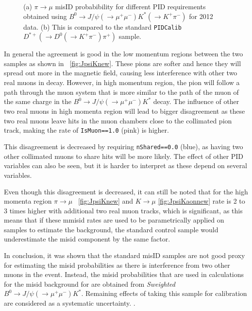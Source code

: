 \begin{figure}[h!]
		\caption{(a) $\pi \rightarrow \mu$ misID probabibility for different PID requirements obtained using $B^{0} \rightarrow J/\psi(\rightarrow \mu^{+} \mu^{-}) K^{*} (\rightarrow {K^{+} \pi^{-}} )$ for 2012 data. (b) This is compared to the standard \texttt{PIDCalib} $D^{*+}(\rightarrow D^{0}(\rightarrow K^{+} \pi^{-}) \pi^{+})$ sample. }
		\label{fig:JpsiKnew}
\end{figure}

In general the agreement is good in the low momentum regions between the two samples as shown in ~\autoref{fig:JpsiKnew}. These pions are softer and hence they will spread out more in the magnetic field, causing less interference with other two real muons in decay. However, in high momentum region, the pion will follow a path through the muon system that is more similar to the path of the muon of the same charge in the $B^{0} \rightarrow J/\psi(\rightarrow \mu^{+} \mu^{-}) K^{*}$ decay. The influence of other two real muons in high momenta region will lead to bigger disagreement as these two real muons leave hits in the muon chambers close to the collimated pion track, making the rate of \texttt{IsMuon==1.0} (pink) is higher. 

This disagreement is decreased by requiring \texttt{nShared==0.0} (blue), as having two other collimated muons to share hits will be more likely. The effect of other \gls{PID} variables can also be seen, but it is harder to interpret as these depend on several variables.

Even though this disagreement is decreased, it can still be noted that for the high momenta region $\pi \rightarrow \mu$ ~\autoref{fig:JpsiKnew} and $K \rightarrow \mu$ \autoref{fig:JpsiKaonnew} rate is 2 to 3 times higher with additional two real muon tracks, which is significant, as this means that if these mmisid rates are used to be parametrically applied on samples to estimate the background, the standard control sample would underestimate the misid component by the same factor.

In conclusion, it was shown that the standard misID samples are not good proxy for estimating the misid probabilities as there is interference from two other muons in the event. Instead, the misid probabilities that are used in calculations for the misid background for \Bmumumu are obtained from \textit{Sweighted} $B^{0} \rightarrow J/\psi(\rightarrow \mu^{+} \mu^{-}) K^{*}$. Remaining effects of taking this sample for calibration are considered as a systematic uncertainty. .



